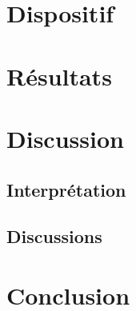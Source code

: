 \documentclass[a4paper,12pt,oneside]{article}
\begin{document}
\section{Dispositif}

\section{Résultats}

\begin{figure}[h!]
  \begin{center}
  \caption{} \label{fig:}
  \end{center}
\end{figure}

\section{Discussion}%

\subsection{Interprétation}

\subsection{Discussions}
\section{Conclusion}






\begin{thebibliography}{99}
\end{thebibliography}
\end{document}
